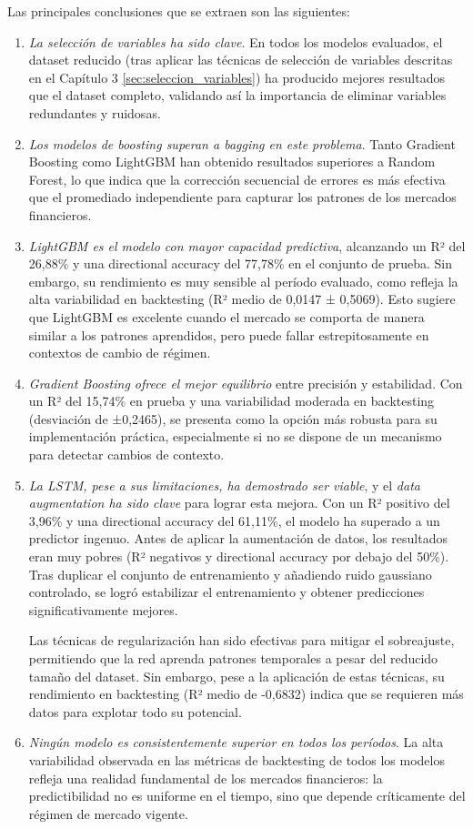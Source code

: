 Las principales conclusiones que se extraen son las siguientes:

\begin{enumerate}
    \item \emph{La selección de variables ha sido clave}. En todos los modelos evaluados, el dataset reducido (tras aplicar las técnicas de selección de variables descritas en el Capítulo 3 \ref{sec:seleccion_variables}) ha producido mejores resultados que el dataset completo, validando así la importancia de eliminar variables redundantes y ruidosas.
    \item \emph{Los modelos de boosting superan a bagging en este problema}. Tanto Gradient Boosting como LightGBM han obtenido resultados superiores a Random Forest, lo que indica que la corrección secuencial de errores es más efectiva que el promediado independiente para capturar los patrones de los mercados financieros.
    \item \emph{LightGBM es el modelo con mayor capacidad predictiva}, alcanzando un R² del 26,88\% y una directional accuracy del 77,78\% en el conjunto de prueba. Sin embargo, su rendimiento es muy sensible al período evaluado, como refleja la alta variabilidad en backtesting (R² medio de 0,0147 ± 0,5069). Esto sugiere que LightGBM es excelente cuando el mercado se comporta de manera similar a los patrones aprendidos, pero puede fallar estrepitosamente en contextos de cambio de régimen.
    \item \emph{Gradient Boosting ofrece el mejor equilibrio} entre precisión y estabilidad. Con un R² del 15,74\% en prueba y una variabilidad moderada en backtesting (desviación de ±0,2465), se presenta como la opción más robusta para su implementación práctica, especialmente si no se dispone de un mecanismo para detectar cambios de contexto.
    \item \emph{La LSTM, pese a sus limitaciones, ha demostrado ser viable}, y el \emph{data augmentation ha sido clave} para lograr esta mejora. Con un R² positivo del 3,96\% y una directional accuracy del 61,11\%, el modelo ha superado a un predictor ingenuo. Antes de aplicar la aumentación de datos, los resultados eran muy pobres (R² negativos y directional accuracy por debajo del 50\%). Tras duplicar el conjunto de entrenamiento y añadiendo ruido gaussiano controlado, se logró estabilizar el entrenamiento y obtener predicciones significativamente mejores. 
    
    Las técnicas de regularización han sido efectivas para mitigar el sobreajuste, permitiendo que la red aprenda patrones temporales a pesar del reducido tamaño del dataset. Sin embargo, pese a la aplicación de estas técnicas, su rendimiento en backtesting (R² medio de -0,6832) indica que se requieren más datos para explotar todo su potencial.
    \item \emph{Ningún modelo es consistentemente superior en todos los períodos}. La alta variabilidad observada en las métricas de backtesting de todos los modelos refleja una realidad fundamental de los mercados financieros: la predictibilidad no es uniforme en el tiempo, sino que depende críticamente del régimen de mercado vigente. 
\end{enumerate}


